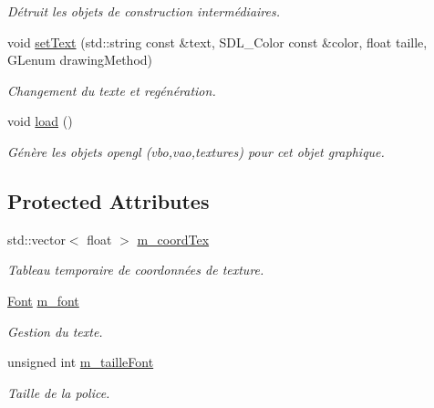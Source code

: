 \begin{DoxyCompactItemize}
\begin{DoxyCompactList}\small\item\em Détruit les objets de construction intermédiaires. \end{DoxyCompactList}\item 
\hypertarget{classLabel_a2691251a8ef0e53e31438feb5606ec35}{void \hyperlink{classLabel_a2691251a8ef0e53e31438feb5606ec35}{set\+Text} (std\+::string const \&text, S\+D\+L\+\_\+\+Color const \&color, float taille, G\+Lenum drawing\+Method)}\label{classLabel_a2691251a8ef0e53e31438feb5606ec35}

\begin{DoxyCompactList}\small\item\em Changement du texte et regénération. \end{DoxyCompactList}\item 
\hypertarget{classLabel_abf96331e65169cd9855dd3690da9de2b}{void \hyperlink{classLabel_abf96331e65169cd9855dd3690da9de2b}{load} ()}\label{classLabel_abf96331e65169cd9855dd3690da9de2b}

\begin{DoxyCompactList}\small\item\em Génère les objets opengl (vbo,vao,textures) pour cet objet graphique. \end{DoxyCompactList}\end{DoxyCompactItemize}
\subsection*{Protected Attributes}
\begin{DoxyCompactItemize}
\item 
\hypertarget{classLabel_a7f03adffc29da896d49f36d23a72c9b6}{std\+::vector$<$ float $>$ \hyperlink{classLabel_a7f03adffc29da896d49f36d23a72c9b6}{m\+\_\+coord\+Tex}}\label{classLabel_a7f03adffc29da896d49f36d23a72c9b6}

\begin{DoxyCompactList}\small\item\em Tableau temporaire de coordonnées de texture. \end{DoxyCompactList}\item 
\hypertarget{classLabel_a8661786a76b31418bc167e1e48b44ac8}{\hyperlink{classFont}{Font} \hyperlink{classLabel_a8661786a76b31418bc167e1e48b44ac8}{m\+\_\+font}}\label{classLabel_a8661786a76b31418bc167e1e48b44ac8}

\begin{DoxyCompactList}\small\item\em Gestion du texte. \end{DoxyCompactList}\item 
\hypertarget{classLabel_a29541e67ad5511df91e29ac41fe29aa7}{unsigned int \hyperlink{classLabel_a29541e67ad5511df91e29ac41fe29aa7}{m\+\_\+taille\+Font}}\label{classLabel_a29541e67ad5511df91e29ac41fe29aa7}

\begin{DoxyCompactList}\small\item\em Taille de la police. \end{DoxyCompactList}\end{DoxyCompactItemize}


